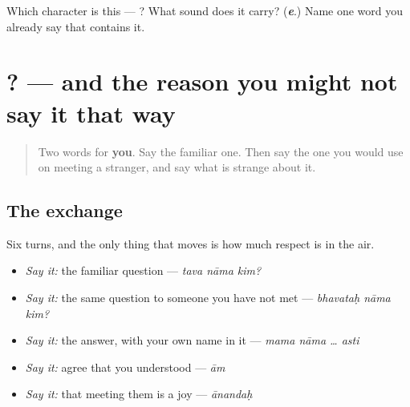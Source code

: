 \begin{tcolorbox}[breakable,colback=teal!4,colframe=teal!35!black,title={Before you move on}]
Which character is this — ? What sound does it carry? (\emph{\textbf{e}}.) Name one word you already say that contains it.
\end{tcolorbox}
\section[\texorpdfstring{\sk{तव} \sk{नाम} \sk{किम्}? (tava nāma kim?)}{तव नाम किम्? (tava nāma kim?)}]{  ? — and the reason you might not say it that way}

\label{lesson:SA-R11-second-pass-the-whole-first-meeting}



\begin{quote}
Two words for \textbf{you}. Say the familiar one. Then say the one you would use on meeting a stranger, and say what is strange about it.
\end{quote}

\subsection*{The exchange}
Six turns, and the only thing that moves is how much respect is in the air.

\begin{itemize}
\raggedright
  \item \emph{Say it:} the familiar question — \emph{tava nāma kim?}
  \item \emph{Say it:} the same question to someone you have not met — \emph{bhavataḥ nāma kim?}
  \item \emph{Say it:} the answer, with your own name in it — \emph{mama nāma … asti}
  \item \emph{Say it:} agree that you understood — \emph{ām}
  \item \emph{Say it:} that meeting them is a joy — \emph{ānandaḥ}
\end{itemize}

